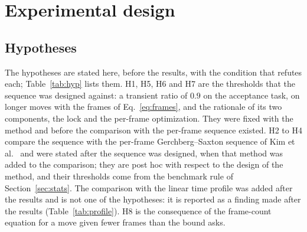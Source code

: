 \section{Experimental design}\label{sec:design}

\subsection{Hypotheses}

The hypotheses are stated here, before the results, with the condition that refutes each; Table~\ref{tab:hyp} lists them. H1, H5, H6 and H7 are the thresholds that the sequence was designed against: a transient ratio of $0.9$ on the acceptance task, on longer moves with the frames of Eq.~\ref{eq:frames}, and the rationale of its two components, the lock and the per-frame optimization. They were fixed with the method and before the comparison with the per-frame sequence existed. H2 to H4 compare the sequence with the per-frame Gerchberg--Saxton sequence of Kim et al.~\cite{kimoe} and were stated after the sequence was designed, when that method was added to the comparison; they are post hoc with respect to the design of the method, and their thresholds come from the benchmark rule of Section~\ref{sec:stats}. The comparison with the linear time profile was added after the results and is not one of the hypotheses: it is reported as a finding made after the results (Table~\ref{tab:profile}). H8 is the consequence of the frame-count equation for a move given fewer frames than the bound asks.


